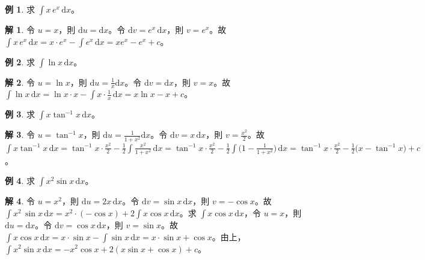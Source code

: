 \documentclass[12pt]{extarticle}
\newcommand{\ds}{\displaystyle}
\theoremstyle{definition}
\newtheorem*{ex}{例}
\newtheorem*{sol}{解}
\begin{document}
\begin{ex}
  求 $\ds\int x\, e^{x}\,\mathrm{d}x$。
\end{ex}

\begin{sol}
  令 $u = x$，則 $\ds\mathrm{d}u = \mathrm{d}x$。令 $\ds\mathrm{d}v = e^x\,\mathrm{d}x$，則 $\ds v = e^x$。故 $\ds\int x\, e^{x}\,\mathrm{d}x = x\cdot e^x - \int e^x\,\mathrm{d}x = xe^x - e^x + c$。
\end{sol}
    
\begin{ex}
  求 $\ds\int\ln x\,\mathrm{d}x$。
\end{ex}

\begin{sol}
  令 $\ds u = \ln x$，則 $\ds\mathrm{d}u = \frac{1}{x}\mathrm{d}x$。令 $\ds\mathrm{d}v = \mathrm{d}x$，則 $v = x$。故 $\ds\int\ln x\,\mathrm{d}x = \ln x \cdot x - \int x\cdot\frac{1}{x}\,\mathrm{d}x = x\ln x - x + c$。
\end{sol}

\begin{ex}
  求 $\ds\int x\tan^{-1} x\,\mathrm{d}x$。
\end{ex}

\begin{sol}
  令 $\ds u = \tan^{-1} x$，則 $\ds\mathrm{d}u = \frac{1}{1 + x^2}\mathrm{d}x$。令 $\ds\mathrm{d}v = x\,\mathrm{d}x$，則 $\ds v = \frac{x^2}{2}$。故 $\ds\int x\tan^{-1} x\,\mathrm{d}x = \tan^{-1} x\cdot\frac{x^2}{2} - \frac{1}{2}\int\frac{x^2}{1 + x^2}\,\mathrm{d}x = \tan^{-1} x\cdot\frac{x^2}{2} - \frac{1}{2}\int\big(1 - \frac{1}{1 + x^2}\big)\,\mathrm{d}x = \tan^{-1}x \cdot\frac{x^2}{2} - \frac{1}{2}\big(x - \tan^{-1} x\big) + c$。
\end{sol}

\begin{ex}
  求 $\ds\int x^2\sin x\,\mathrm{d}x$。
\end{ex}

\begin{sol}
  令 $\ds u = x^2$，則 $\ds\mathrm{d}u = 2x\,\mathrm{d}x$。令 $\ds\mathrm{d}v = \sin x\,\mathrm{d}x$，則 $\ds v = -\cos x$。故 $\ds\int x^2\,\sin x\,\mathrm{d}x = x^2\cdot(-\cos x) + 2 \int x \cos x\,\mathrm{d}x$。求 $\ds\int x \cos x\,\mathrm{d}x$，令 $\ds u = x$，則 $\ds\mathrm{d}u = \mathrm{d}x$。令 $\ds\mathrm{d}v = \cos x\,\mathrm{d}x$，則 $\ds v = \sin x$。故 $\ds\int x \cos x\,\mathrm{d}x = x\cdot\sin x - \int\sin x\,\mathrm{d}x = x\cdot\sin x + \cos x$。由上，$\ds\int x^2\sin x\,\mathrm{d}x = -x^2\cos x + 2 (x\sin x + \cos x) + c$。
\end{sol}
    
\end{document}
